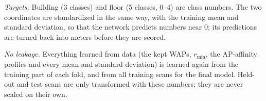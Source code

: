 \emph{Targets.} Building (3 classes) and floor (5 classes, 0--4) are class
numbers. The two coordinates are standardized in the same way, with the
training mean and standard deviation, so that the network predicts numbers
near 0; its predictions are turned back into meters before they are scored.

\emph{No leakage.} Everything learned from data (the kept WAPs, $r_{\min}$, the
AP-affinity profiles and every mean and standard deviation) is learned again
from the training part of each fold, and from all training scans for the final
model. Held-out and test scans are only transformed with these numbers; they
are never scaled on their own.
